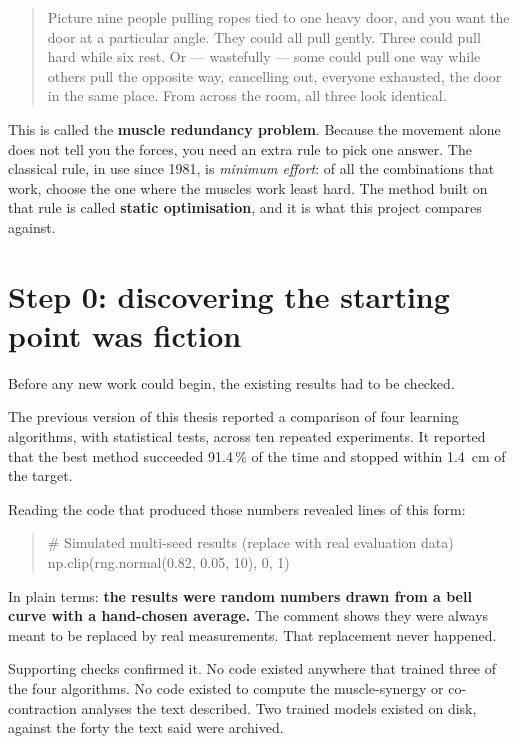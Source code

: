 \documentclass[11pt, a4paper]{article}
\begin{document}
\begin{quote}
Picture nine people pulling ropes tied to one heavy door, and you want the door at
a particular angle. They could all pull gently. Three could pull hard while six
rest. Or --- wastefully --- some could pull one way while others pull the opposite
way, cancelling out, everyone exhausted, the door in the same place. From across
the room, all three look identical.
\end{quote}

This is called the \textbf{muscle redundancy problem}. Because the movement alone
does not tell you the forces, you need an extra rule to pick one answer. The
classical rule, in use since 1981, is \emph{minimum effort}: of all the
combinations that work, choose the one where the muscles work least hard. The
method built on that rule is called \textbf{static optimisation}, and it is what
this project compares against.

\section{Step 0: discovering the starting point was fiction}

Before any new work could begin, the existing results had to be checked.

The previous version of this thesis reported a comparison of four learning
algorithms, with statistical tests, across ten repeated experiments. It reported
that the best method succeeded 91.4\,\% of the time and stopped within
\SI{1.4}{\centi\meter} of the target.

Reading the code that produced those numbers revealed lines of this form:

\begin{quote}\ttfamily
\# Simulated multi-seed results (replace with real evaluation data)\\
np.clip(rng.normal(0.82, 0.05, 10), 0, 1)
\end{quote}

In plain terms: \textbf{the results were random numbers drawn from a bell curve
with a hand-chosen average.} The comment shows they were always meant to be
replaced by real measurements. That replacement never happened.

Supporting checks confirmed it. No code existed anywhere that trained three of
the four algorithms. No code existed to compute the muscle-synergy or
co-contraction analyses the text described. Two trained models existed on disk,
against the forty the text said were archived.
\end{document}
